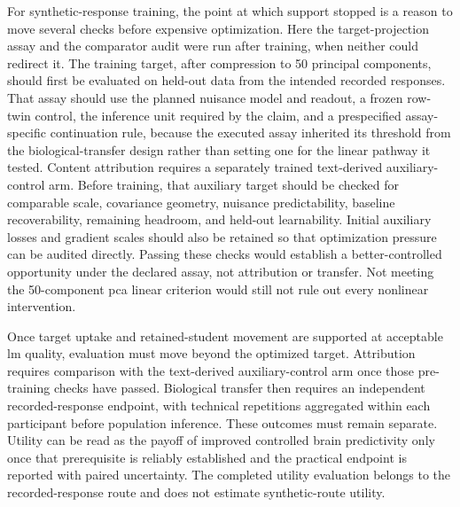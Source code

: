 For synthetic-response training, the point at which support stopped is a reason to move several checks before expensive optimization.
Here the target-projection assay and the comparator audit were run after training, when neither could redirect it.
The training target, after compression to 50 principal components, should first be evaluated on held-out data from the intended recorded responses.
That assay should use the planned nuisance model and readout, a frozen row-twin control, the inference unit required by the claim, and a prespecified assay-specific continuation rule, because the executed assay inherited its threshold from the biological-transfer design rather than setting one for the linear pathway it tested.
Content attribution requires a separately trained text-derived auxiliary-control arm.
Before training, that auxiliary target should be checked for comparable scale, covariance geometry, nuisance predictability, baseline recoverability, remaining headroom, and held-out learnability.
Initial auxiliary losses and gradient scales should also be retained so that optimization pressure can be audited directly.
Passing these checks would establish a better-controlled opportunity under the declared assay, not attribution or transfer.
Not meeting the 50-component \ac{pca} linear criterion would still not rule out every nonlinear intervention.

Once target uptake and retained-student movement are supported at acceptable \ac{lm} quality, evaluation must move beyond the optimized target.
Attribution requires comparison with the text-derived auxiliary-control arm once those pre-training checks have passed.
Biological transfer then requires an independent recorded-response endpoint, with technical repetitions aggregated within each participant before population inference.
These outcomes must remain separate.
Utility can be read as the payoff of improved controlled brain predictivity only once that prerequisite is reliably established and the practical endpoint is reported with paired uncertainty.
The completed utility evaluation belongs to the recorded-response route and does not estimate synthetic-route utility.

